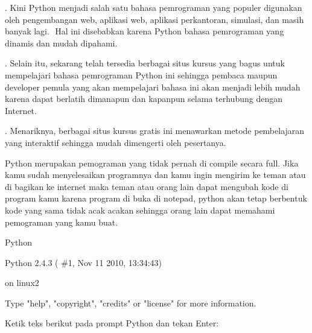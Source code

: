 {{{{{{{{{\noindent 
{\fontsize{14pt}{14pt}. Kini Python menjadi salah satu bahasa pemrograman yang populer digunakan oleh pengembangan $  $web, aplikasi $  $web, aplikasi perkantoran, simulasi, dan masih banyak lagi. $  $ Hal ini disebabkan karena Python bahasa pemrograman yang dinamis dan mudah dipahami. \\} \par
\noindent 
{\fontsize{14pt}{14pt}. Selain itu, sekarang telah tersedia berbagai situs kursus yang bagus untuk mempelajari bahasa pemrograman Python ini sehingga pembaca maupun developer pemula yang akan mempelajari bahasa ini akan menjadi lebih mudah karena dapat berlatih dimanapun dan kapanpun selama terhubung dengan Internet. \\} \par
\noindent 
{\fontsize{14pt}{14pt}. Menariknya, berbagai situs kursus gratis ini menawarkan metode pembelajaran yang interaktif sehingga mudah dimengerti oleh pesertanya. \\} \par
\noindent 
{\fontsize{14pt}{14pt}\selectfont Python merupakan pemograman yang tidak pernah di compile secara full. Jika kamu sudah menyelesaikan programnya dan kamu ingin mengirim ke teman atau di bagikan ke internet maka teman atau orang lain dapat mengubah kode di program kamu karena program di buka di notepad, python akan tetap berbentuk kode yang sama tidak acak acakan sehingga orang lain dapat memahami pemograman yang kamu buat. \\} \par
\vspace{14pt}
\noindent 
{\fontsize{14pt}{14pt}\selectfont Python \\} \par
\vspace{14pt}
\noindent 
{\fontsize{14pt}{14pt}\selectfont Python 2.4.3 ( $  \#  $1, Nov 11 2010, 13:34:43) \\} \par
\noindent 
{\fontsize{14pt}{14pt} on linux2 \\} \par
\noindent 
{\fontsize{14pt}{14pt}\selectfont Type "help", "copyright", "credits" or "license" for more information. \\} \par
\vspace{14pt}
\noindent 
{\fontsize{14pt}{14pt}\selectfont Ketik teks berikut pada prompt Python dan tekan Enter: \\} \par
}}}}}}}}}
